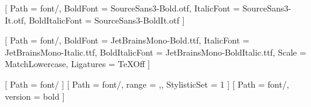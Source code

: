 \setsansfont{SourceSans3-Regular.otf}[          %
  Path           = font/,                       %
  BoldFont       = SourceSans3-Bold.otf,        %
  ItalicFont     = SourceSans3-It.otf,          %
  BoldItalicFont = SourceSans3-BoldIt.otf       %
]

\setmonofont{JetBrainsMono-Regular.ttf}[        %
  Path           = font/,                       %
  BoldFont       = JetBrainsMono-Bold.ttf,      %
  ItalicFont     = JetBrainsMono-Italic.ttf,    %
  BoldItalicFont = JetBrainsMono-BoldItalic.ttf,%
  Scale          = MatchLowercase,              %
  Ligatures      = TeXOff                       %
]

[          %
  Path           = font/                        %
]
[          %
  Path           = font/,                       %
  range          = {\mathcal,\mathbfcal},       %
  StylisticSet   = 1                            %
]
[                %
  Path           = font/,                       %
  version        = bold                         %
]
\providecommand{\bm}[1]{\symbf{#1}}             %

